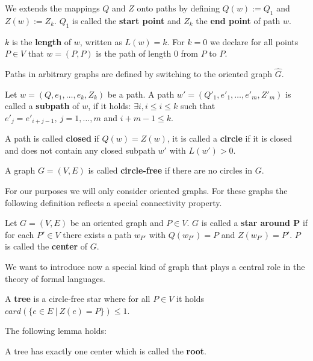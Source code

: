 We extends the mappings $Q$ and $Z$ onto paths by defining $Q(w) := Q_1$ and
$Z(w) := Z_k$. $Q_1$ is called the {\bf start point} and $Z_k$ the {\bf end
point} of path $w$.

$k$ is the {\bf length} of $w$, written as $L(w) = k$. For $k = 0$ we declare
for all points $P \in V$ that $w = (P, P)$ is the path of length 0 from $P$ to
$P$.

Paths in arbitrary graphs are defined by switching to the oriented graph
$\hat{G}$.

\begin{definition}
Let $w = (Q, e_1, \ldots, e_k, Z_k)$ be a path. A path $w' = (Q'_1, e'_1,
\ldots, e'_m, Z'_m)$ is called a {\bf subpath} of $w$, if it holds: $\exists i,
i \leq i \leq k$ such that $e'_j = e'_{i+j-1},\ j = 1, \ldots, m$ and $i + m -
1 \leq k$.
\end{definition}

A path is called {\bf closed} if $Q(w) = Z(w)$, it is called a {\bf circle} if
it is closed and does not contain any closed subpath $w'$ with $L(w') > 0$.

\begin{definition}
A graph $G = (V, E)$ is called {\bf circle-free} if there are no circles in $G$.
\end{definition}

For our purposes we will only consider oriented graphs. For these graphs the
following definition reflects a special connectivity property.

\begin{definition}
Let $G = (V, E)$ be an oriented graph and $P \in V$. $G$ is called a {\bf star
around P} if for each $P' \in V$ there exists a path $w_{P'}$ with $Q(w_{P'}) =
P$ and $Z(w_{P'}) = P'$. $P$ is called the {\bf center} of $G$.
\end{definition} 

We want to introduce now a special kind of graph that plays a central role in
the theory of formal languages.

\begin{definition}
A {\bf tree} is a circle-free star where for all $P \in V$ it holds $card(\{ e
\in E\ |\ Z(e) = P\}) \leq 1$.
\end{definition}

The following lemma holds:

\begin{lemma}
A tree has exactly one center which is called the {\bf root}.
\end{lemma}

